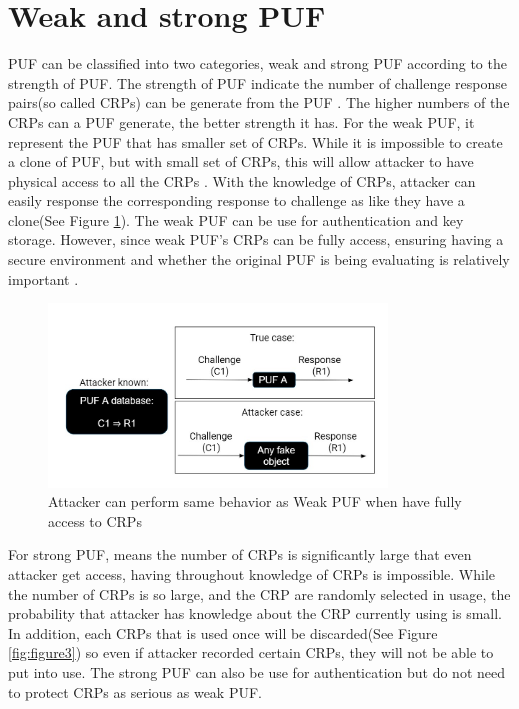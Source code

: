 \section{Weak and strong PUF}
PUF can be classified into two categories, weak and strong PUF according to the strength of PUF. The strength of PUF indicate the number of challenge response pairs(so called CRPs) can be generate 
from the PUF \cite{Reference1}. The higher numbers of the CRPs can a PUF generate, the better strength it has. For the weak PUF, it represent the PUF that has smaller set of CRPs. While it is impossible to 
create a clone of PUF, but with small set of CRPs, this will allow attacker to have physical access to all the CRPs \cite{Reference1}. With the knowledge of CRPs, attacker can easily response the corresponding
response to challenge as like they have a clone(See Figure \ref{fig:figure2}). The weak PUF can be use for authentication and key storage. However, since weak PUF's CRPs can be fully access, ensuring having a secure environment and whether the original PUF is being evaluating is relatively important \cite{Reference1}.
\begin{figure}[ht]
    \centering
    \includegraphics[width=9cm]{figures/figure2.jpg}
    \caption{Attacker can perform same behavior as Weak PUF when have fully access to CRPs}
    \label{fig:figure2}
    \end{figure}

For strong PUF, means the number of CRPs is significantly large that even attacker get access, having throughout knowledge of CRPs is impossible. While the number of CRPs is so large,
and the CRP are randomly selected in usage, the probability that attacker has knowledge about the CRP currently using is small. In addition, each CRPs that is used once will 
be discarded(See Figure \ref{fig:figure3}) so even if attacker recorded certain CRPs, they will not be able to put into use. The strong PUF can also be use for authentication but do not need to protect CRPs
as serious as weak PUF.

